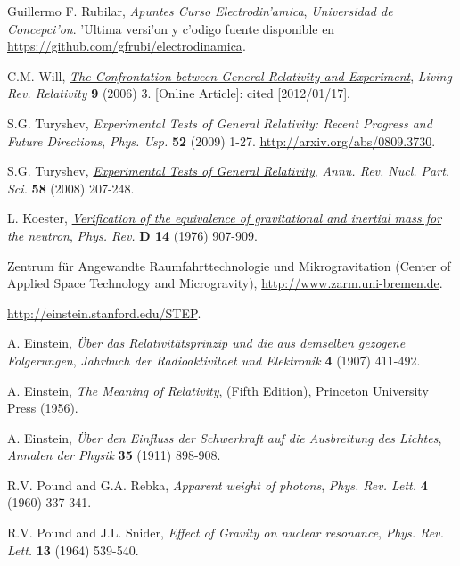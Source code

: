 \begin{thebibliography}{99}


Guillermo F. Rubilar, {\it Apuntes Curso Electrodin'amica}, {\sl
Universidad de Concepci'on}. 'Ultima versi'on y c'odigo fuente disponible en \url{https://github.com/gfrubi/electrodinamica}.

 C.M. Will, \href{http://www.livingreviews.org/lrr-2006-3}{\em The Confrontation between General Relativity and Experiment}, {\sl Living Rev. Relativity} {\bf 9} (2006) 3. [Online Article]: cited [2012/01/17].

 S.G. Turyshev, {\em Experimental Tests of General Relativity: Recent Progress and Future Directions}, {\sl Phys. Usp.} {\bf 52} (2009) 1-27. \url{http://arxiv.org/abs/0809.3730}.

 S.G. Turyshev, \href{http://www.annualreviews.org/doi/abs/10.1146/annurev.nucl.58.020807.111839}{\em Experimental Tests of General Relativity}, {\sl Annu. Rev. Nucl. Part. Sci.} {\bf 58} (2008) 207-248. 

 L. Koester, \href{http://dx.doi.org/10.1103/PhysRevD.14.907}{\em Verification of the equivalence of gravitational and inertial mass for the neutron}, {\sl Phys. Rev.} {\bf D 14} (1976) 907-909.

 Zentrum f\"ur Angewandte Raumfahrttechnologie und Mikrogravitation (Center of Applied Space Technology and Microgravity), \url{http://www.zarm.uni-bremen.de}.

 \url{http://einstein.stanford.edu/STEP}.

 A. Einstein, {\it \"Uber das Relativit\"atsprinzip und die aus demselben gezogene Folgerungen}, {\sl Jahrbuch der Radioaktivitaet und Elektronik} {\bf 4} (1907) 411-492.

 A. Einstein, \emph{The Meaning of Relativity}, (Fifth
Edition), Princeton University Press (1956).

 A. Einstein, {\it \"Uber den Einfluss der Schwerkraft auf die Ausbreitung des Lichtes}, {\sl Annalen der Physik} {\bf 35} (1911) 898-908.

 R.V. Pound and G.A. Rebka, {\em Apparent weight of photons}, {\sl Phys. Rev. Lett.} {\bf 4} (1960) 337-341.

 R.V. Pound and J.L. Snider, {\em Effect of Gravity on nuclear resonance}, {\sl Phys. Rev. Lett.} {\bf 13} (1964) 539-540.


\end{thebibliography}
